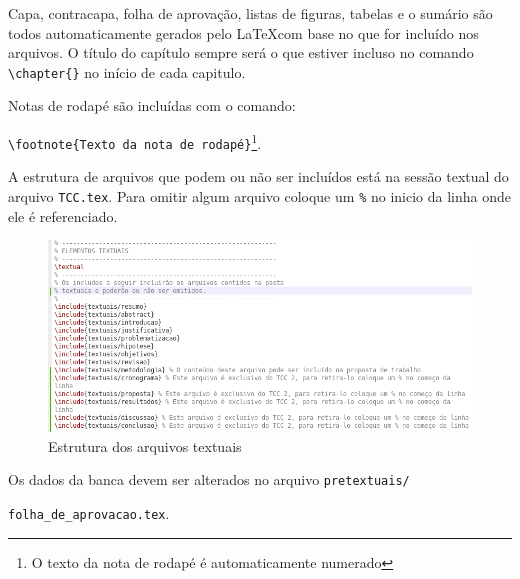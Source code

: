 Capa, contracapa, folha de aprovação, listas de figuras, tabelas e o sumário são todos automaticamente gerados pelo \LaTeX   com base no que for incluído nos arquivos. O título do capítulo sempre será o que estiver incluso no comando \verb|\chapter{}| no início de cada capitulo. 

Notas de rodapé são incluídas com o comando:\par
\verb|\footnote{Texto da nota de rodapé}|\footnote{O texto da nota de rodapé é automaticamente numerado}.

A estrutura de arquivos que podem ou não ser incluídos está na sessão textual do arquivo \verb|TCC.tex|. Para omitir algum arquivo coloque um \verb|%| no inicio da linha onde ele é referenciado. 

\begin{figure}[!htb]
	\centering 
	\includegraphics[width=\textwidth]{imagens/estrutura}
	\caption{Estrutura dos arquivos textuais}
	\label{fig:estrutura}
\end{figure}

Os dados da banca devem ser alterados no arquivo \verb|pretextuais/|\par\verb|folha_de_aprovacao.tex|.